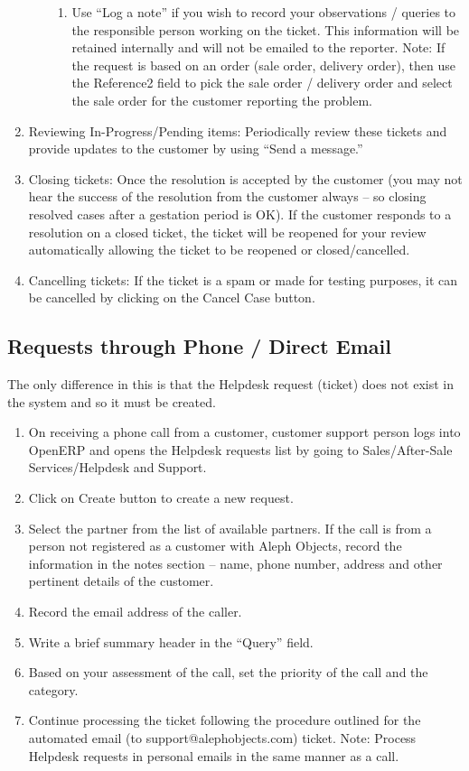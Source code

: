 \begin{enumerate}
\begin{enumerate}
\begin{enumerate}
    \item Use “Log a note” if you wish to record your observations / queries to the responsible person working on the ticket. This information will be retained internally and will not be emailed to the reporter.
Note: If the request is based on an order (sale order, delivery order), then use the Reference2 field to pick the sale order / delivery order and select the sale order for the customer reporting the problem.
    \end{enumerate}
  \end{enumerate}
\item Reviewing In-Progress/Pending items: Periodically review these tickets and provide updates to the customer by using “Send a message.”
\item Closing tickets: Once the resolution is accepted by the customer (you may not hear the success of the resolution from the customer always – so closing resolved cases after a gestation period is OK). If the customer responds to a resolution on a closed ticket, the ticket will be reopened for your review automatically allowing the ticket to be reopened or closed/cancelled.
\item Cancelling tickets: If the ticket is a spam or made for testing purposes, it can be cancelled by clicking on the Cancel Case button.
\end{enumerate}


\subsection{Requests through Phone / Direct Email}

The only difference in this is that the Helpdesk request (ticket) does not exist in the system and so it must be created.
\begin{enumerate}
\item On receiving a phone call from a customer,  customer support person logs into OpenERP and opens the Helpdesk requests list by going to Sales/After-Sale Services/Helpdesk and Support. 
\item Click on Create button to create a new request.
\item Select the partner from the list of available partners. If the call is from a person not registered as a customer with Aleph Objects, record the information in the notes section – name, phone number, address and other pertinent details of the customer.
\item Record the email address of the caller. 
\item Write a brief summary header in the “Query” field.
\item Based on your assessment of the call, set the priority of the call and the category.
\item Continue processing the ticket following the procedure outlined for the automated email (to support@alephobjects.com) ticket.
Note: Process Helpdesk requests in personal emails in the same manner as a call.
\end{enumerate}

